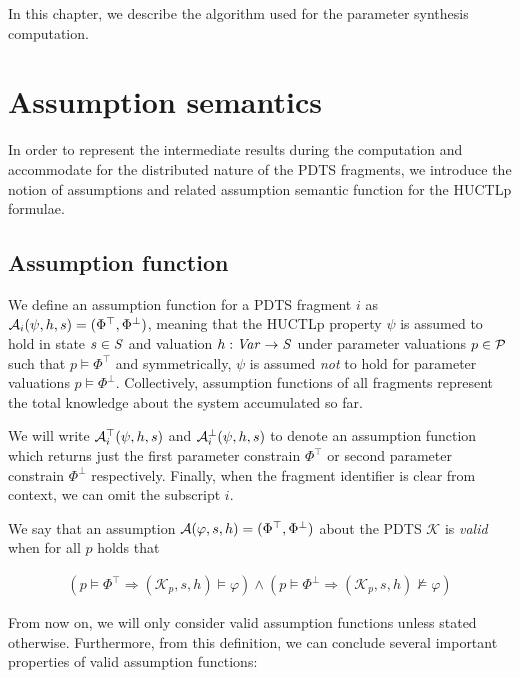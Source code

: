 In this chapter, we describe the algorithm used for the parameter synthesis computation.

\section{Assumption semantics}

In order to represent the intermediate results during the computation and accommodate for the distributed nature of the \ac{PDTS} fragments, we introduce the notion of assumptions and related assumption semantic function for the \ac{HUCTLp} formulae.

\subsection{Assumption function}

We define an assumption function for a \ac{PDTS} fragment $i$ as $\mathcal{A}_i(\psi, h, s) = (\Phi^\top, \Phi^\bot)$, meaning that the \ac{HUCTLp} property $\psi$ is assumed to hold in state $s \in \mathit{S}$ and valuation $h : \mathit{Var} \to \mathit{S}$ under parameter valuations $p \in \mathcal{P}$ such that $p \models \Phi^\top$ and symmetrically, $\psi$ is assumed \emph{not} to hold for parameter valuations $p \models \Phi^\bot$. Collectively, assumption functions of all fragments represent the total knowledge about the system accumulated so far.

We will write $\mathcal{A}^\top_i(\psi, h, s)$ and $\mathcal{A}^\bot_i(\psi, h, s)$ to denote an assumption function which returns just the first parameter constrain $\Phi^\top$ or second parameter constrain $\Phi^\bot$ respectively. Finally, when the fragment identifier is clear from context, we can omit the subscript $i$.

We say that an assumption $\mathcal{A}(\varphi, s, h) = (\Phi^\top, \Phi^\bot)$ about the \ac{PDTS} $\mathcal{K}$ is \emph{valid} when for all $p$ holds that

\begin{align*}
	(p \models \Phi^\top \Rightarrow (\mathcal{K}_p, s, h) \models \varphi) \land (p \models \Phi^\bot \Rightarrow (\mathcal{K}_p, s, h) \not\models \varphi) 
\end{align*}

From now on, we will only consider valid assumption functions unless stated otherwise. Furthermore, from this definition, we can conclude several important properties of valid assumption functions:

